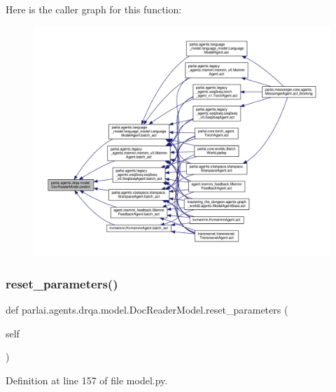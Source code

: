 Here is the caller graph for this function\+:
\nopagebreak
\begin{figure}[H]
\begin{center}
\leavevmode
\includegraphics[width=350pt]{classparlai_1_1agents_1_1drqa_1_1model_1_1DocReaderModel_a798f609dcd78b3e66e00a81f26f12603_icgraph}
\end{center}
\end{figure}
\mbox{\label{classparlai_1_1agents_1_1drqa_1_1model_1_1DocReaderModel_ac509d418866e6d8bd2ad29eaf1152f52}} 
\subsubsection{\texorpdfstring{reset\+\_\+parameters()}{reset\_parameters()}}
{\footnotesize\ttfamily def parlai.\+agents.\+drqa.\+model.\+Doc\+Reader\+Model.\+reset\+\_\+parameters (\begin{DoxyParamCaption}\item[{}]{self }\end{DoxyParamCaption})}



Definition at line 157 of file model.\+py.



